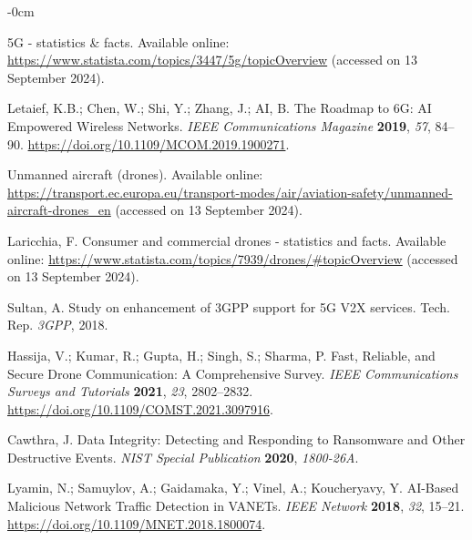 \documentclass[futureinternet,article,submit,pdftex,moreauthors]{Definitions/mdpi}
\begin{document}
\begin{adjustwidth}{-\extralength}{0cm}


\begin{thebibliography}{999}

5G - statistics \& facts. Available online: \url{https://www.statista.com/topics/3447/5g/topicOverview} (accessed on 13 September 2024).

Letaief, K.B.; Chen, W.; Shi, Y.; Zhang, J.; AI, B. The Roadmap to 6G: AI Empowered Wireless Networks. {\em IEEE Communications Magazine} {\bf 2019}, {\em 57}, 84--90. \url{https://doi.org/10.1109/MCOM.2019.1900271}.

Unmanned aircraft (drones). Available online: \url{https://transport.ec.europa.eu/transport-modes/air/aviation-safety/unmanned-aircraft-drones_en} (accessed on 13 September 2024).

Laricchia, F. Consumer and commercial drones - statistics and facts. Available online: \url{https://www.statista.com/topics/7939/drones/\#topicOverview} (accessed on 13 September 2024).

Sultan, A. Study on enhancement of 3GPP support for 5G V2X services. Tech. Rep. {\em 3GPP}, 2018.

Hassija, V.; Kumar, R.; Gupta, H.; Singh, S.; Sharma, P. Fast, Reliable, and Secure Drone Communication: A Comprehensive Survey. {\em IEEE Communications Surveys and Tutorials} {\bf 2021}, {\em 23}, 2802--2832. \url{https://doi.org/10.1109/COMST.2021.3097916}.

Cawthra, J. Data Integrity: Detecting and Responding to Ransomware and Other Destructive Events. {\em NIST Special Publication} {\bf 2020}, {\em 1800-26A}.

Lyamin, N.; Samuylov, A.; Gaidamaka, Y.; Vinel, A.; Koucheryavy, Y. AI-Based Malicious Network Traffic Detection in VANETs. {\em IEEE Network} {\bf 2018}, {\em 32}, 15--21. \url{https://doi.org/10.1109/MNET.2018.1800074}.


\end{thebibliography}
\end{adjustwidth}
\end{document}
